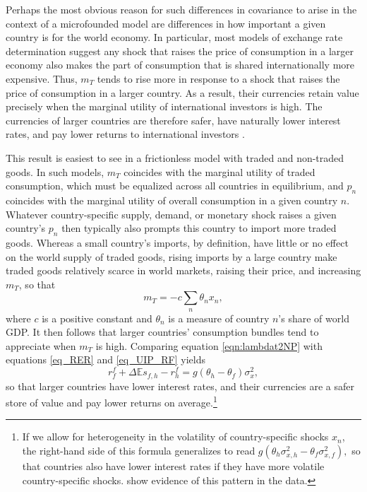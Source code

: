 \documentclass[11pt]{article}
\begin{document}
Perhaps the most obvious reason for such differences in covariance to arise in the context of a microfounded model are differences in how important a given country is for the world economy. In particular, most models of exchange rate determination suggest any shock that raises the price of consumption in a larger economy also makes the part of consumption that is shared internationally more expensive. Thus, $m_T$ tends to rise more in response to a shock that raises the price of consumption in a larger country. As a result, their currencies retain value precisely when the marginal utility of international investors is high. The currencies of larger countries are therefore safer, have naturally lower interest rates, and pay lower returns to international investors \citep{Martin2012, Hassan2013}.

This result is easiest to see in a frictionless model with traded and non-traded goods. In such models, $m_T$ coincides with the marginal utility of traded consumption, which must be equalized across all countries in equilibrium, and $p_n$ coincides with the marginal utility of overall consumption in a given country $n$. Whatever country-specific supply, demand, or monetary shock raises a given country's $p_n$ then typically also prompts this country to import more traded goods. Whereas a small country's imports, by definition, have little or no effect on the world supply of traded goods, rising imports by a large country make traded goods relatively scarce in world markets, raising their price, and increasing $m_T$, so that
\begin{equation} 
    m_{T} = -c \sum_{n} \theta_n x_n,
    \label{eqn:lambdat2NP}
\end{equation}
where $c$ is a positive constant and $\theta_n$ is a measure of country $n$'s share of world GDP. It then follows that larger countries' consumption bundles tend to appreciate when $m_T$ is high. Comparing equation \ref{eqn:lambdat2NP} with equations \ref{eq_RER} and \ref{eq_UIP_RF} yields
\begin{equation}
  r^f_f + \Delta \mathbb{E} s_{f, h} - r^f_h
  =g\left(\theta_h - \theta_f\right) \sigma_x^2,
  \label{eq_FF_UIP}
\end{equation}
so that larger countries have lower interest rates, and their currencies are a safer store of value and pay lower returns on average.\footnote{If we allow for heterogeneity in the volatility of country-specific shocks $x_n$, the right-hand side of this formula generalizes to read $g(\theta_h \sigma_{x,h}^2 - \theta_f \sigma_{x,f}^2),$ so that countries also have lower interest rates if they have more volatile country-specific shocks. \cite{to2020nontraded} show evidence of this pattern in the data.  }
  
\end{document}
